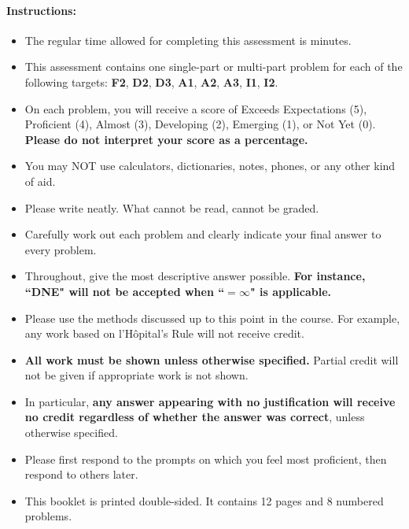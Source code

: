 \documentclass[11pt]{article}
\begin{document}
{%

\paragraph*{Instructions:}

\begin{itemize}
    
    \item The regular time allowed for completing this assessment is  minutes.
    \item This assessment contains one single-part or multi-part problem for each of the following targets: {\bf\color{ProcessBlue} F2}, {\bf\color{ForestGreen} D2},   {\bf\color{ForestGreen} D3}, {\bf\color{RedOrange} A1}, {\bf\color{RedOrange} A2}, {\bf\color{RedOrange} A3}, {\bf\color{Fuchsia} I1}, {\bf\color{Fuchsia} I2}.
    \item On each problem, you will receive a score of Exceeds Expectations (5), Proficient (4), Almost (3), Developing (2), Emerging (1), or Not Yet (0). {\bf Please do not interpret your score as a percentage.}
    \item You may NOT use calculators, dictionaries, notes, phones, or any other kind of aid.
    \item Please write neatly. What cannot be read, cannot be graded.
    \item Carefully work out each problem and clearly indicate your final answer to every problem.
    \item Throughout, give the most descriptive answer possible. \textbf{For instance, ``DNE" will not be accepted when ``$=\infty$" is applicable.}
    \item Please use the methods discussed up to this point in the course. For example, any work based on l'H\^opital's Rule will not receive credit.
    \item \textbf{All work must be shown unless otherwise specified.} Partial credit will not be given if appropriate work is not shown.
    \item In particular, {\bf any answer appearing with no justification will receive no credit regardless of whether the answer was correct}, unless otherwise specified.
    \item Please first respond to the prompts on which you feel most proficient, then respond to others later.
    \item This booklet is printed double-sided. It contains 12 pages and 8 numbered problems.
    \end{itemize}
    
    }
\end{document}
